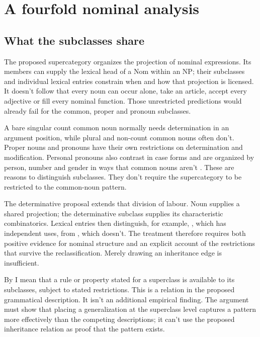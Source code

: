 \documentclass[12pt]{article}
\begin{document}
\section{A fourfold nominal analysis}\label{sec:proposal}

\subsection{What the subclasses share}

The proposed supercategory organizes the projection of nominal expressions. Its members can supply the lexical head of a Nom within an NP; their subclasses and individual lexical entries constrain when and how that projection is licensed. It doesn't follow that every noun can occur alone, take an article, accept every adjective or fill every nominal function. Those unrestricted predictions would already fail for the common, proper and pronoun subclasses.

A bare singular count common noun normally needs determination in an argument position, while plural and non-count common nouns often don't. Proper nouns and pronouns have their own restrictions on determination and modification. Personal pronouns also contrast in case forms and are organized by person, number and gender in ways that common nouns aren't \citep[425--427]{huddleston2002}. These are reasons to distinguish subclasses. They don't require the supercategory to be restricted to the common-noun pattern.

The determinative proposal extends that division of labour. Noun supplies a shared projection; the determinative subclass supplies its characteristic combinatorics. Lexical entries then distinguish, for example, , which has independent uses, from , which doesn't. The treatment therefore requires both positive evidence for nominal structure and an explicit account of the restrictions that survive the reclassification. Merely drawing an inheritance edge is insufficient.

By  I mean that a rule or property stated for a superclass is available to its subclasses, subject to stated restrictions. This is a relation in the proposed grammatical description. It isn't an additional empirical finding. The argument must show that placing a generalization at the superclass level captures a pattern more effectively than the competing descriptions; it can't use the proposed inheritance relation as proof that the pattern exists.
\end{document}
